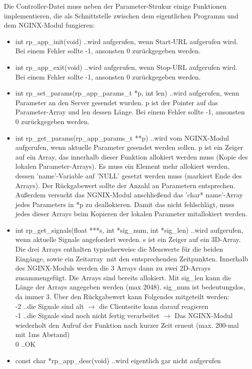 \documentclass[11pt]{scrartcl}
\begin{document}
Die Controller-Datei muss neben der Parameter-Strukur einige Funktionen implementieren, die als Schnittstelle zwischen dem eigentlichen Programm und dem NGINX-Modul fungieren:
\begin{itemize}
\item int rp\_app\_init(void) ..wird aufgerufen, wenn Start-URL aufgerufen wird. Bei einem Fehler sollte -1, ansonsten 0 zurückgegeben werden.
\item int rp\_app\_exit(void) ..wird aufgerufen, wenn Stop-URL aufgerufen wird. Bei einem Fehler sollte -1, ansonsten 0 zurückgegeben werden.
\item int rp\_set\_params(rp\_app\_params\_t *p, int len) ..wird aufgerufen, wenn Parameter an den Server gesendet wurden. p ist der Pointer auf das Parameter-Array und len dessen Länge. Bei einem Fehler sollte -1, ansonsten 0 zurückgegeben werden.
\item int rp\_get\_params(rp\_app\_params\_t **p) ..wird vom NGINX-Modul aufgerufen, wenn aktuelle Parameter gesendet werden sollen. p ist ein Zeiger auf ein Array, das innerhalb dieser Funktion allokiert werden muss (Kopie des lokalen Parameter-Arrays). Es muss ein Element mehr allokiert werden, dessen 'name'-Variable auf 'NULL' gesetzt werden muss (markiert Ende des Arrays). Der Rückgabewert sollte der Anzahl an Parametern entsprechen. Außerdem versucht das NGNIX-Modul anschließend das 'char* name'-Array jedes Parameters in *p zu deallokieren. Damit das nicht fehlschlägt, muss jedes dieser Arrays beim Kopieren der lokalen Parameter mitallokiert werden.
\item int rp\_get\_signals(float ***s, int *sig\_num, int *sig\_len) ..wird aufgerufen, wenn aktuelle Signale angefordert werden. s ist ein Zeiger auf ein 3D-Array. Die drei Arrays enthalten typischerweise die Messwerte für die beiden Eingänge, sowie ein \grqq Zeitarray\grqq~mit den entsprechenden Zeitpunkten. Innerhalb des NGINX-Moduls werden die 3 Arrays dann zu zwei 2D-Arrays zusammengefügt. Die Arrays sind bereits allokiert. Mit sig\_len kann die Länge der Arrays angegeben werden (max 2048). sig\_num ist bedeutungslos, da immer 3. Über den Rückgabewert kann Folgendes mitgeteilt werden:\\
-2 ..die Signale sind alt $\to$ die Clientseite kann darauf reagieren\\
-1 ..die Signale sind noch nicht fertig verarbeitet $\to$ Das NGINX-Modul wiederholt den Aufruf der Funktion nach kurzer Zeit erneut (max. 200-mal mit 1ms Abstand)\\
0  ..OK
\item const char *rp\_app\_desc(void) ..wird eigentlich gar nicht aufgerufen
\end{itemize} 
\end{document}
